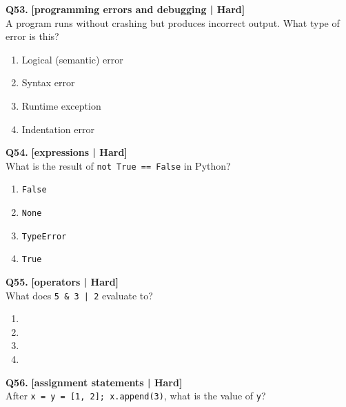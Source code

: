 \noindent\textbf{Q53.} \hfill {\small\color{LPUOrange}\textbf{[programming errors and debugging | Hard]}}\\[2pt]
A program runs without crashing but produces incorrect output. What type of error is this?

\begin{enumerate}[label=(\alph*),topsep=2pt,itemsep=1pt,partopsep=0pt,parsep=0pt]
    \item \relax Logical (semantic) error
    \item \relax Syntax error
    \item \relax Runtime exception
    \item \relax Indentation error
\end{enumerate}
\vspace{2mm}

\noindent\textbf{Q54.} \hfill {\small\color{LPUOrange}\textbf{[expressions | Hard]}}\\[2pt]
What is the result of \texttt{not True == False} in Python?

\begin{enumerate}[label=(\alph*),topsep=2pt,itemsep=1pt,partopsep=0pt,parsep=0pt]
    \item \relax \texttt{False}
    \item \relax \texttt{None}
    \item \relax \texttt{TypeError}
    \item \relax \texttt{True}
\end{enumerate}
\vspace{2mm}

\noindent\textbf{Q55.} \hfill {\small\color{LPUOrange}\textbf{[operators | Hard]}}\\[2pt]
What does \texttt{5 \& 3 | 2} evaluate to?

\begin{enumerate}[label=(\alph*),topsep=2pt,itemsep=1pt,partopsep=0pt,parsep=0pt]
    \item {}
    \item {}
    \item {}
    \item {}
\end{enumerate}
\vspace{2mm}

\noindent\textbf{Q56.} \hfill {\small\color{LPUOrange}\textbf{[assignment statements | Hard]}}\\[2pt]
After \texttt{x = y = [1, 2]; x.append(3)}, what is the value of \texttt{y}?

